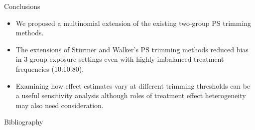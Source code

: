 \documentclass[final]{beamer}
\begin{document}
\begin{frame}[label={sec:org6cddcf1}]{}
\begin{columns}
\begin{column}[t]{0.48\columnwidth}
\begin{block}{Conclusions}
\begin{itemize}
\item We proposed a multinomial extension of the existing two-group PS trimming methods.

\item The extensions of Stürmer and Walker’s PS trimming methods reduced bias in 3-group exposure settings even with highly imbalanced treatment frequencies (10:10:80).

\item Examining how effect estimates vary at different trimming thresholds can be a useful sensitivity analysis although roles of treatment effect heterogeneity may also need consideration.
\end{itemize}
\end{block}

\begin{block}{Bibliography}
\vspace{-0.7ex}
\scriptsize
\renewcommand{\section}[2]{}


\end{block}
\end{column}
\end{columns}
\end{frame}
\end{document}

